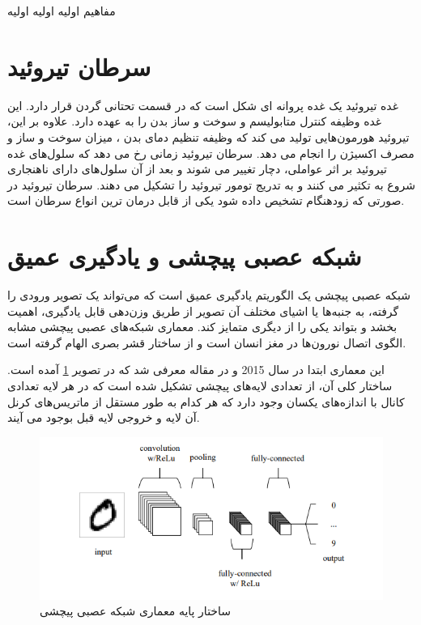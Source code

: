 مفاهیم اولیه اولیه اولیه

\section{سرطان تیروئید}\label{sec:سرطان-تیروئید}
غده تیروئید یک غده پروانه ای شکل است که در قسمت تحتانی گردن قرار دارد.
این غده وظیفه کنترل متابولیسم و سوخت و ساز بدن را به عهده دارد.
علاوه بر این، تیروئید هورمون‌هایی تولید می کند که وظیفه تنظیم دمای بدن ، میزان سوخت و ساز و مصرف اکسیژن را انجام می دهد.
سرطان تیروئید زمانی رخ می دهد که سلول‌های غده تیروئید بر اثر عواملی، دچار تغییر می شوند و بعد از آن سلول‌های دارای ناهنجاری شروع به تکثیر می کنند و به تدریج تومور تیروئید را تشکیل می دهند.
سرطان تیروئید در صورتی که زودهنگام تشخیص داده شود یکی از قابل درمان ترین انواع سرطان است.







\section{شبکه عصبی پیچشی و یادگیری عمیق}\label{sec:شبکه عصبی پیچشی و یادگیری عمیق}
شبکه عصبی پیچشی یک الگوریتم یادگیری عمیق است که می‌تواند یک تصویر ورودی را گرفته، به جنبه‌ها یا اشیای مختلف آن تصویر از طریق وزن‌دهی قابل یادگیری، اهمیت بخشد و بتواند یکی را از دیگری متمایز کند. معماری شبکه‌های عصبی پیچشی مشابه الگوی اتصال نورون‌ها در مغز انسان است و از ساختار قشر بصری الهام گرفته است.

این معماری ابتدا در سال 2015 و در مقاله \cite{o2015introduction} معرفی شد که در تصویر \ref{fig:cnnarchitecture} آمده است. ساختار کلی آن، از تعدادی لایه‌های پیچشی تشکیل شده است که در هر لایه تعدادی کانال با اندازه‌های یکسان وجود دارد که هر کدام به طور مستقل از ماتریس‌های کرنل آن لایه و خروجی لایه قبل بوجود می آیند.
\begin{figure}
    \begin{center}
        \includegraphics[width=0.8\linewidth]{figs/basic_concepts/subs/cnn_image_processing/basic_cnn_arhitecture.PNG}
    \end{center}
    \caption{ساختار پایه معماری شبکه عصبی پیچشی\cite{o2015introduction}}
    \label{fig:cnnarchitecture}
\end{figure}

